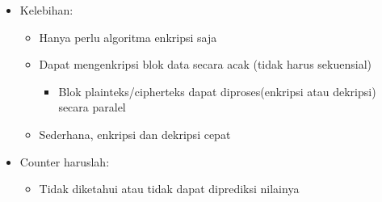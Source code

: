 \documentclass{article}
\begin{document}

\begin{itemize}
    \item Kelebihan:
    \begin{itemize}
        \item Hanya perlu algoritma enkripsi saja
        \item Dapat mengenkripsi blok data secara acak (tidak harus sekuensial)
        \begin{itemize}
            \item Blok plainteks/cipherteks dapat diproses(enkripsi atau dekripsi) secara paralel
        \end{itemize}
        \item Sederhana, enkripsi dan dekripsi cepat
    \end{itemize}
    \vspace{10mm}
    \item Counter haruslah:
    \begin{itemize}
        \item Tidak diketahui atau tidak dapat diprediksi nilainya
    \end{itemize}
\end{itemize}
\end{document}
